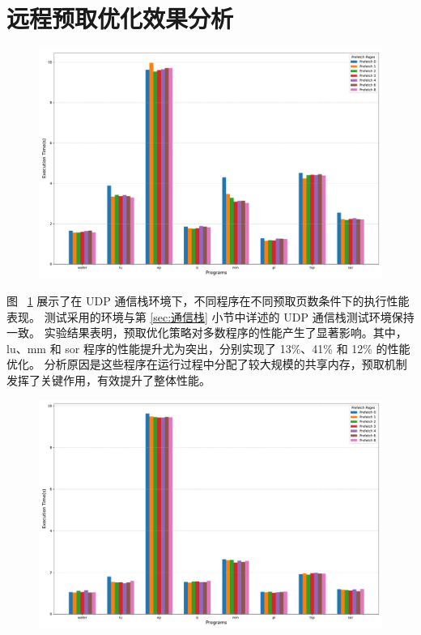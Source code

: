 {    \section{远程预取优化效果分析}\label{sec:远程预取优化效果分析}
    \begin{figure}[!htbp]
        \centering
        \includegraphics[width=0.90\linewidth]{Img/udp_prefetch_execution_time.pdf}
        \label{fig:udp-prefetch-result}
    \end{figure}
    图 ~\ref{fig:udp-prefetch-result} 展示了在 UDP 通信栈环境下，不同程序在不同预取页数条件下的执行性能表现。
    测试采用的环境与第 \ref{sec:通信栈}  小节中详述的 UDP 通信栈测试环境保持一致。
    实验结果表明，预取优化策略对多数程序的性能产生了显著影响。其中，lu、mm 和 sor 程序的性能提升尤为突出，分别实现了 13\%、41\% 和 12\% 的性能优化。
    分析原因是这些程序在运行过程中分配了较大规模的共享内存，预取机制发挥了关键作用，有效提升了整体性能。

    \begin{figure}
        \centering
        \includegraphics[width=0.90\linewidth]{Img/rdma_prefetch_execution_time.pdf}
        \label{fig:rdma-prefetch-result}
    \end{figure}

}
